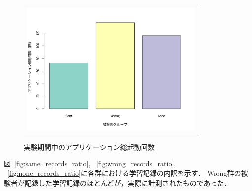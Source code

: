 \begin{figure}[htb]
\begin{center}
\begin{tabular}{c}
\begin{minipage}[htb]{\linewidth}
  \begin{center}
  \includegraphics[width=9cm]{images/7/app_open_count.pdf}
  \caption{実験期間中のアプリケーション総起動回数}
  \label{fig:app_open_count}
  \end{center}
\end{minipage}

\end{tabular}
\end{center}
\end{figure}

図~\ref{fig:same_records_ratio}, ~\ref{fig:wrong_records_ratio}, ~\ref{fig:none_records_ratio}に各群における学習記録の内訳を示す．
Wrong群の被験者が記録した学習記録のほとんどが，実際に計測されたものであった．

